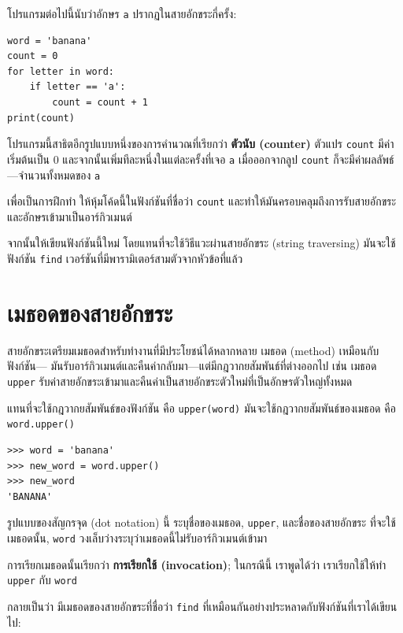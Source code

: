 โปรแกรมต่อไปนี้นับว่าอักษร {\tt a} ปรากฏในสายอักขระกี่ครั้ง:

\begin{verbatim}
word = 'banana'
count = 0
for letter in word:
    if letter == 'a':
        count = count + 1
print(count)
\end{verbatim}
%
โปรแกรมนี้สาธิตอีกรูปแบบหนึ่งของการคำนวณที่เรียกว่า {\bf ตัวนับ (counter)}
ตัวแปร {\tt count} มีค่าเริ่มต้นเป็น 0 และจากนั้นเพิ่มทีละหนึ่งในแต่ละครั้งที่เจอ {\tt a}
เมื่อออกจากลูป {\tt count} ก็จะมีค่าผลลัพธ์---จำนวนทั้งหมดของ {\tt a}

เพื่อเป็นการฝึกทำ ให้หุ้มโค้ดนี้ในฟังก์ชันที่ชื่อว่า {\tt count} 
และทำให้มันครอบคลุมถึงการรับสายอักขระและอักษรเข้ามาเป็นอาร์กิวเมนต์

จากนั้นให้เขียนฟังก์ชันนี้ใหม่ โดยแทนที่จะใช้วิธีแวะผ่านสายอักขระ (string traversing) มันจะใช้ฟังก์ชัน 
{\tt find} เวอร์ชันที่มีพารามิเตอร์สามตัวจากหัวข้อที่แล้ว


\section{เมธอดของสายอักขระ}%
\label{optional}

สายอักขระเตรียมเมธอดสำหรับทำงานที่มีประโยชน์ได้หลากหลาย  เมธอด (method) เหมือนกับฟังก์ชัน---
มันรับอาร์กิวเมนต์และคืนค่ากลับมา---แต่มีกฎวากยสัมพันธ์ที่ต่างออกไป เช่น เมธอด {\tt upper}
รับค่าสายอักขระเข้ามาและคืนค่าเป็นสายอักขระตัวใหม่ที่เป็นอักษรตัวใหญ่ทั้งหมด


แทนที่จะใช้กฎวากยสัมพันธ์ของฟังก์ชัน คือ {\tt upper(word)} มันจะใช้กฎวากยสัมพันธ์ของเมธอด คือ 
{\tt word.upper()}

\begin{verbatim}
>>> word = 'banana'
>>> new_word = word.upper()
>>> new_word
'BANANA'
\end{verbatim}
%
รูปแบบของสัญกรจุด (dot notation) นี้ ระบุชื่อของเมธอด, {\tt upper}, และชื่อของสายอักขระ
ที่จะใช้เมธอดนั้น, {\tt word}  วงเล็บว่างระบุว่าเมธอดนี้ไม่รับอาร์กิวเมนต์เข้ามา

การเรียกเมธอดนั้นเรียกว่า {\bf การเรียกใช้ (invocation)}; ในกรณีนี้ เราพูดได้ว่า เราเรียกใช้ให้ทำ {\tt upper} กับ {\tt word}

กลายเป็นว่า มีเมธอดของสายอักขระที่ชื่อว่า {\tt find} ที่เหมือนกันอย่างประหลาดกับฟังก์ชันที่เราได้เขียนไป:

